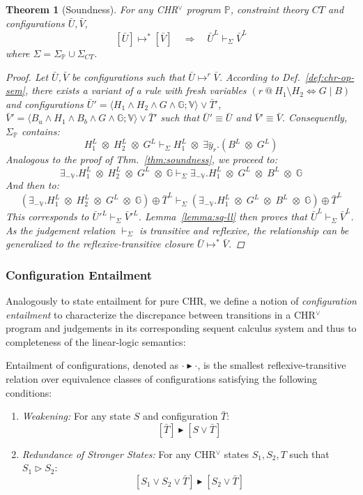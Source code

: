 \documentclass[acmtocl]{acmtrans2m}
\newtheorem{theorem}{Theorem}[section]
\newcommand\state[1]{\langle #1 \rangle}
\newcommand\ent{\rhd}
\newcommand\entv{\blacktriangleright}
\newcommand{\bbP}{\ensuremath{\mathbb{P}}}
\newcommand{\V}{\ensuremath{\mathbb{V}}}
\newcommand{\G}{\ensuremath{\mathbb{G}}}
\newcommand{\Sct}{\ensuremath{\Sigma_{CT}}}
\newcommand{\Sp}{\ensuremath{\Sigma_\mathbb{P}}}
\newcommand{\bT}{\bar{T}}
\newcommand{\bU}{\bar{U}}
\newcommand{\bV}{\bar{V}}
\newcommand{\by}{\bar{y}}
\newcommand{\x}{{\;\otimes\;}}
\begin{document}
\begin{theorem}[Soundness]
  \label{thm:vee-soundness}
  For any CHR$^\vee$ program $\bbP$, constraint theory $CT$ and configurations $\bU,\bV$,
  \[
  	[\bU]\mapsto^{*}[\bV] \quad\Rightarrow\quad \bU^L\vdash_\Sigma \bV^L
  \]
  where $\Sigma=\Sp\cup\Sct$.
\begin{proof}
Let $\bU,\bV$ be configurations such that $\bU\mapsto^{r}\bV$. According to
Def.~\ref{def:chr-op-sem}, there exists a variant of a rule with fresh variables
$(r\ @\ H_1\setminus H_2 \Leftrightarrow G\mid B)$ and configurations
$\bU'=\state{H_1\wedge H_2 \wedge G\wedge\G; \V}\vee\bT'$, $\bV'=\state{B_u
\wedge H_1\wedge B_b\wedge G\wedge\G; \V}\vee\bT'$  such that $\bU'\equiv
\bU$ and $\bV'\equiv \bV$.
Consequently, $\Sp$ contains:
\[
  H_1^L\x H_2^L\x G^L \vdash_\Sigma H_1^L\x \exists\by_r.(B^L\x G^L)
\]
Analogous to the proof of Thm.~\ref{thm:soundness}, we proceed to:
\[
  \exists_{-\V}.H_1^L\x H_2^L\x G^L\x\G
   \vdash_\Sigma
  \exists_{-\V}.H_1^L\x G^L \x B^L\x\G
\]
And then to:
\[
  (\exists_{-\V}.H_1^L\x H_2^L\x G^L\x\G)\oplus {\bT}^L
   \vdash_\Sigma
  (\exists_{-\V}.H_1^L\x G^L \x B^L\x\G)\oplus {\bT}^L
\]
This corresponds to $\bU'^L\vdash_\Sigma \bV'^L$. Lemma~\ref{lemma:sq-ll} then
proves that ${\bU}^L\vdash_\Sigma {\bV}^L$. As the judgement relation
$\vdash_\Sigma$ is transitive and reflexive, the relationship can be generalized
to the reflexive-transitive closure $\bU\mapsto^{*} \bV$.
\end{proof}
\end{theorem}

\subsubsection{Configuration Entailment}

Analogously to state entailment for pure CHR, we define a notion of
\emph{configuration entailment} to characterize the discrepance between
transitions in a CHR$^\vee$ program and judgements in its corresponding sequent
calculus system and thus to completeness of the linear-logic semantics:

\begin{definition}
\label{def:c_entail}
Entailment of configurations, denoted as $\cdot\entv\cdot$, is the smallest
reflexive-transitive relation over equivalence classes of configurations satisfying
the following conditions:
  \begin{enumerate}
    \item \label{cond:cn_wea}
    \emph{Weakening:} For any state $S$ and configuration
    $\bar T$:
    \[
        [ \bar T ]
          \entv
        [ S \vee \bar T ]
      \]
    \item \label{cond:cn_stronger}
    \emph{Redundance of Stronger States:} For any CHR$^\vee$
      states $S_1,S_2,T$ such that
      $S_1\ent S_2$:
      \[
        [ S_1 \vee S_2 \vee \bar T ]
          \entv
        [ S_2 \vee \bar T ]
      \]
    \end{enumerate}
\end{definition}
\end{document}
